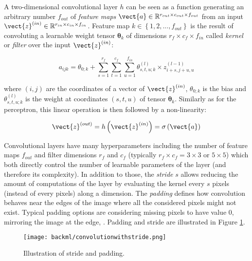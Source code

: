 A two-dimensional convolutional layer $h$ can be seen as a function generating an arbitrary number $f_{out}$ of \textit{feature maps} $\vect{a} \in \mathbb{R}^{r_{out} \times c_{out} \times f_{out}}$ from an input $\vect{z}^{(in)} \in \mathbb{R}^{r_{in} \times c_{in} \times f_{in}}$. Feature map $k \in \left\{1, 2, ..., f_{out}\right\}$ is the result of convoluting a learnable weight tensor $\pmb{\theta}_k$ of dimensions $r_f \times c_f \times f_{in}$ called \textit{kernel} or \textit{filter} over the input $\vect{z}^{(in)}$:

\begin{equation}
\label{eqn:backml:convnet}
a_{ijk} = \theta_{0;k} + \sum_{s=1}^{r_f} \sum_{t=1}^{c_f} \sum_{u=1}^{f_{in}} \theta^{(l)}_{s,t,u;k} \times z^{(l-1)}_{i+s,j+u,u}
\end{equation}

where $(i, j)$ are the coordinates of a vector of $\vect{z}^{(in)}$, $\theta_{0;k}$ is the bias and $\theta^{(l)}_{s,t,u;k}$ is the weight at coordinates $(s,t,u)$ of tensor $\pmb{\theta}_k$. Similarly as for the perceptron, this linear operation is then followed by a non-linearity:

\begin{equation}
\label{eqn:backml:convnetwithactiv}
\vect{z}^{(out)} = h\left(\vect{z}^{(in)}\right) = \sigma\left(\vect{a}\right)
\end{equation}

Convolutional layers have many hyperparameters including the number of feature maps $f_{out}$ and filter dimensions $r_f$ and $c_f$ (typically $r_f \times c_f = 3 \times 3$ or $5 \times 5$) which both directly control the number of learnable parameters of the layer (and therefore its complexity). In addition to those, the \textit{stride} $s$ allows reducing the amount of computations of the layer by evaluating the kernel every $s$ pixels (instead of every pixels) along a dimension. The \textit{padding} defines how convolution behaves near the edges of the image where all the considered pixels might not exist. Typical padding options are considering missing pixels to have value 0, mirroring the image at the edge, \etc. Padding and stride are illustrated in Figure \ref{fig:backml:paddingstride}.

\begin{figure}
  \centering
  \texttt{[image: backml/convolutionwithstride.png]}
  \caption{Illustration of stride and padding.}
  \label{fig:backml:paddingstride}
\end{figure}

